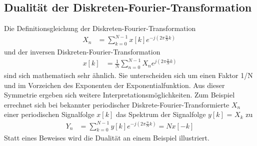 \subsection{Dualität der Diskreten-Fourier-Transformation}\label{sec:dualituxe4t-der-diskreten-fourier-transformation}

Die Definitionsgleichung der Diskreten-Fourier-Transformation
\begin{align}
X_{n} &= \sum\limits_{k = 0}^{N - 1}{x[ k]  e^{- j  \left( 2  \pi  \frac{n}{N}  k \right)}}\ \label{eq:10.41}
\end{align}
und der inversen Diskreten-Fourier-Transformation
\begin{align}
x[ k] &= \frac{1}{N}  \sum\limits_{n = 0}^{N - 1}X_{n}  e^{j  \left( 2  \pi  \frac{n}{N}  k \right)} \label{eq:10.42}
\end{align}
sind sich mathematisch sehr ähnlich. Sie unterscheiden sich um einen Faktor 1/N und im Vorzeichen des Exponenten der Exponentialfunktion. Aus dieser Symmetrie ergeben sich weitere Interpretationsmöglichkeiten. Zum Beispiel errechnet sich bei bekannter periodischer Diskrete-Fourier-Transformierte \(X_{n}\) einer periodischen Signalfolge \(x[k]\) das Spektrum der Signalfolge \(y[k]\) = \(X_{k}\) zu
\begin{align}
Y_{n} &= \sum\limits_{k = 0}^{N - 1}{y[ k]  e^{- j  \left( 2  \pi  \frac{n}{N}  k \right)}} = N  x[ - k] \label{eq:10.43}
\end{align}
Statt eines Beweises wird die Dualität an einem Beispiel illustriert.

